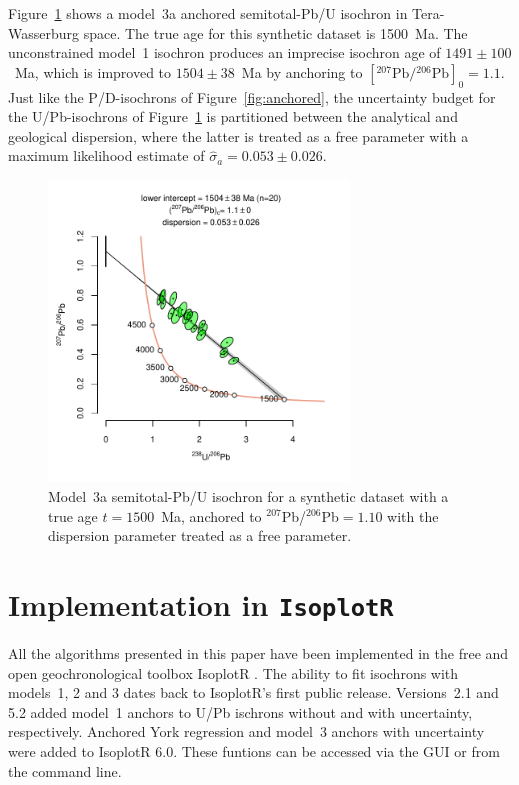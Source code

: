 \documentclass{article}
\begin{document}
Figure~\ref{fig:UPb} shows a model~3a anchored semitotal-Pb/U isochron
in Tera-Wasserburg space. The true age for this synthetic dataset is
1500~Ma. The unconstrained model~1 isochron produces an imprecise
isochron age of $1491\pm{100}$~Ma, which is improved to
$1504\pm{38}$~Ma by anchoring to
$[{}^{207}\mbox{Pb}/{}^{206}\mbox{Pb}]_0=1.1$. Just like the
P/D-isochrons of Figure~\ref{fig:anchored}, the uncertainty budget for
the U/Pb-isochrons of Figure~\ref{fig:UPb} is partitioned between the
analytical and geological dispersion, where the latter is treated as a
free parameter with a maximum likelihood estimate of
$\hat{\sigma}_a={0.053}\pm{0.026}$.

\begin{figure}[!ht]
  \includegraphics[width=8cm]{fig4.pdf}
  \caption{Model~3a semitotal-Pb/U isochron for a synthetic dataset
    with a true age $t=1500$~Ma, anchored to $^{207}$Pb/$^{206}$Pb$=
    1.10$ with the dispersion parameter treated as a free
    parameter.}
  \label{fig:UPb}
\end{figure}

\section{Implementation in \texttt{IsoplotR}}\label{sec:IsoplotR}

All the algorithms presented in this paper have been implemented in
the free and open geochronological toolbox IsoplotR
\citep{vermeesch2018c}. The ability to fit isochrons with models~1, 2
and 3 dates back to IsoplotR's first public release. Versions~2.1 and
5.2 added model~1 anchors to U/Pb ischrons without and with
uncertainty, respectively. Anchored York regression and model~3
anchors with uncertainty were added to IsoplotR 6.0. These funtions
can be accessed via the GUI or from the command line.\medskip
\end{document}
